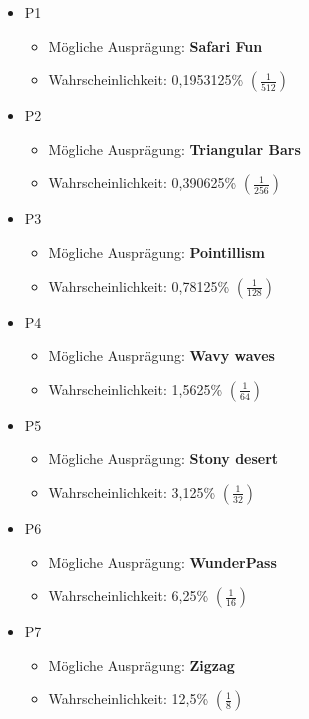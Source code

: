 \begin{NFT-Prop}
\begin{itemize}
    \item P1
    \begin{itemize}
    	\item Mögliche Ausprägung: \textbf{Safari Fun} 
    	\item Wahrscheinlichkeit: 0,1953125\% $\left( \frac{1}{512} \right)$
    \end{itemize}
    \item P2
    \begin{itemize}
    	\item Mögliche Ausprägung: \textbf{Triangular Bars} 
    	\item Wahrscheinlichkeit: 0,390625\% $\left( \frac{1}{256} \right)$
    \end{itemize}
    \item P3
    \begin{itemize}
    	\item Mögliche Ausprägung: \textbf{Pointillism} 
    	\item Wahrscheinlichkeit: 0,78125\% $\left( \frac{1}{128} \right)$
    \end{itemize}
    \item P4
    \begin{itemize}
    	\item Mögliche Ausprägung: \textbf{Wavy waves} 
    	\item Wahrscheinlichkeit: 1,5625\% $\left( \frac{1}{64} \right)$
    \end{itemize}
    \item P5
    \begin{itemize}
    	\item Mögliche Ausprägung: \textbf{Stony desert} 
    	\item Wahrscheinlichkeit: 3,125\% $\left( \frac{1}{32} \right)$
    \end{itemize}
    \item P6
    \begin{itemize}
    	\item Mögliche Ausprägung: \textbf{WunderPass} 
    	\item Wahrscheinlichkeit: 6,25\% $\left( \frac{1}{16} \right)$
    \end{itemize}
    \item P7
    \begin{itemize}
    	\item Mögliche Ausprägung: \textbf{Zigzag} 
    		\item Wahrscheinlichkeit: 12,5\% $\left( \frac{1}{8} \right)$

\end{itemize}
\end{itemize}
\end{NFT-Prop}
